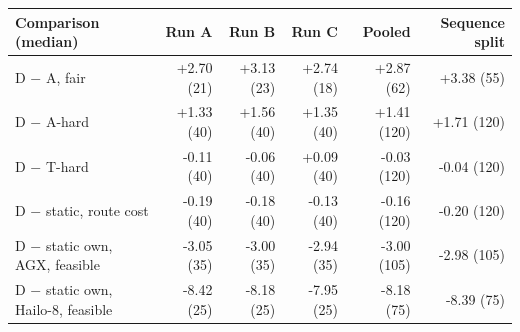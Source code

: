 \begin{tabular}{@{}lrrrrr@{}}
\toprule
Comparison (median) & Run A & Run B & Run C & Pooled & Sequence split \\
\midrule
D $-$ A, fair & +2.70 (21) & +3.13 (23) & +2.74 (18) & +2.87 (62) & +3.38 (55) \\
D $-$ A-hard & +1.33 (40) & +1.56 (40) & +1.35 (40) & +1.41 (120) & +1.71 (120) \\
D $-$ T-hard & -0.11 (40) & -0.06 (40) & +0.09 (40) & -0.03 (120) & -0.04 (120) \\
D $-$ static, route cost & -0.19 (40) & -0.18 (40) & -0.13 (40) & -0.16 (120) & -0.20 (120) \\
D $-$ static own, AGX, feasible & -3.05 (35) & -3.00 (35) & -2.94 (35) & -3.00 (105) & -2.98 (105) \\
D $-$ static own, Hailo-8, feasible & -8.42 (25) & -8.18 (25) & -7.95 (25) & -8.18 (75) & -8.39 (75) \\
\bottomrule
\end{tabular}
